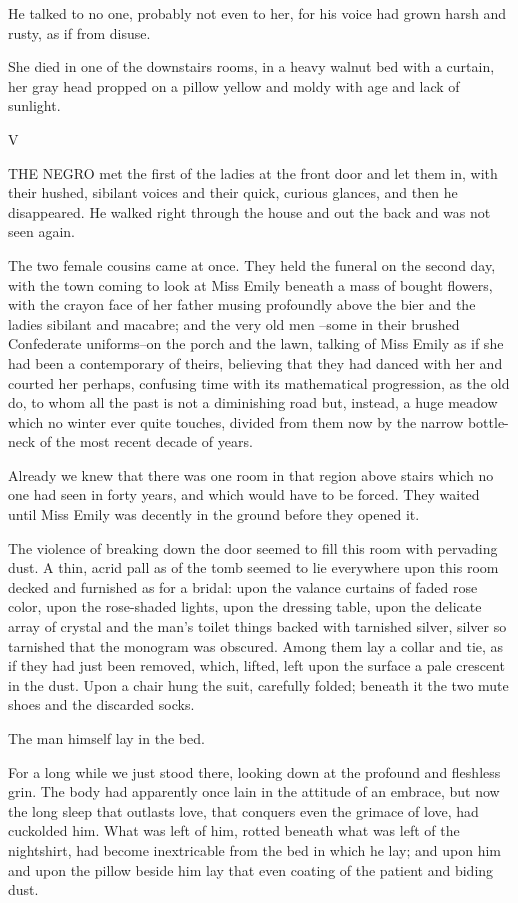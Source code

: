 \documentclass[10pt,a4paper]{article}
\begin{document}
He talked to no one, probably not even to her, for his voice had grown harsh and rusty, as if from disuse.

She died in one of the downstairs rooms, in a heavy walnut bed with a curtain, her gray head propped on a pillow yellow and moldy with age and lack of sunlight.

V

THE NEGRO met the first of the ladies at the front door and let them in, with their hushed, sibilant voices and their quick, curious glances, and then he disappeared. He walked right through the house and out the back and was not seen again.

The two female cousins came at once. They held the funeral on the second day, with the town coming to look at Miss Emily beneath a mass of bought flowers, with the crayon face of her father musing profoundly above the bier and the ladies sibilant and macabre; and the very old men --some in their brushed Confederate uniforms--on the porch and the lawn, talking of Miss Emily as if she had been a contemporary of theirs, believing that they had danced with her and courted her perhaps, confusing time with its mathematical progression, as the old do, to whom all the past is not a diminishing road but, instead, a huge meadow which no winter ever quite touches, divided from them now by the narrow bottle-neck of the most recent decade of years.

Already we knew that there was one room in that region above stairs which no one had seen in forty years, and which would have to be forced. They waited until Miss Emily was decently in the ground before they opened it.

The violence of breaking down the door seemed to fill this room with pervading dust. A thin, acrid pall as of the tomb seemed to lie everywhere upon this room decked and furnished as for a bridal: upon the valance curtains of faded rose color, upon the rose-shaded lights, upon the dressing table, upon the delicate array of crystal and the man's toilet things backed with tarnished silver, silver so tarnished that the monogram was obscured. Among them lay a collar and tie, as if they had just been removed, which, lifted, left upon the surface a pale crescent in the dust. Upon a chair hung the suit, carefully folded; beneath it the two mute shoes and the discarded socks.

The man himself lay in the bed.

For a long while we just stood there, looking down at the profound and fleshless grin. The body had apparently once lain in the attitude of an embrace, but now the long sleep that outlasts love, that conquers even the grimace of love, had cuckolded him. What was left of him, rotted beneath what was left of the nightshirt, had become inextricable from the bed in which he lay; and upon him and upon the pillow beside him lay that even coating of the patient and biding dust.
\end{document}
